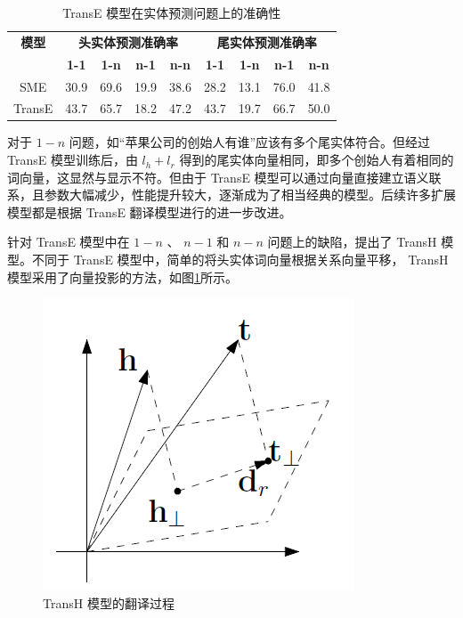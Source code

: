 \documentclass{llncs}
\begin{document}
\begin{table}
	\centering
	\caption{ TransE 模型在实体预测问题上的准确性}
	\label{tb:TransE}
	\begin{threeparttable}
		\begin{tabular}{ccccccccc}
			\hline
			\textbf{模型} & \multicolumn{4}{c}{\textbf{头实体预测准确率}} & \multicolumn{4}{c}{\textbf{尾实体预测准确率}} \\
			\textbf{} & \textbf{1-1} & \textbf{1-n} & \textbf{n-1} & \textbf{n-n} & \textbf{1-1} & \textbf{1-n} & \textbf{n-1} & \textbf{n-n} \\ \hline
			SME & 30.9 & 69.6 & 19.9 & 38.6 & 28.2 & 13.1 & 76.0 & 41.8\\
			TransE & 43.7 & 65.7 & 18.2 & 47.2 & 43.7 & 19.7 & 66.7 & 50.0 \\ \hline
		\end{tabular}
	\end{threeparttable}
\end{table}

对于 $1-n$ 问题，如“苹果公司的创始人有谁”应该有多个尾实体符合。但经过 TransE 模型训练后，由 $l_h+l_r$ 得到的尾实体向量相同，即多个创始人有着相同的词向量，这显然与显示不符。但由于 TransE 模型可以通过向量直接建立语义联系，且参数大幅减少，性能提升较大，逐渐成为了相当经典的模型。后续许多扩展模型都是根据 TransE 翻译模型进行的进一步改进。

针对 TransE 模型中在 $1-n$ 、 $n-1$ 和 $n-n$ 问题上的缺陷，提出了 TransH 模型\cite{DBLP:conf/aaai/WangZFC14}。不同于 TransE 模型中，简单的将头实体词向量根据关系向量平移， TransH 模型采用了向量投影的方法，如图\ref{fg:TransH}所示。

\begin{figure}
	\centering
	\includegraphics[width=0.5\columnwidth]{figures/TransH.png}
	\caption{ TransH 模型的翻译过程}
	\label{fg:TransH}
\end{figure}
\end{document}

